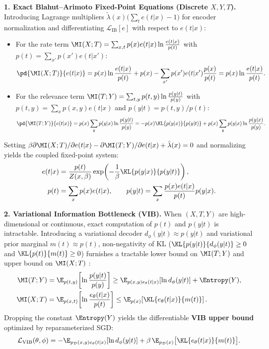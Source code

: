 \documentclass[../../../../master.tex]{subfiles}
\begin{document}
\begin{coremath}
\label{cm:infotheory:ib_vib}
\textbf{1. Exact Blahut--Arimoto Fixed-Point Equations (Discrete $X, Y, T$).} Introducing Lagrange multipliers $\tilde{\lambda}(x)\bigl(\sum_t e(t|x) - 1\bigr)$ for encoder normalization and differentiating $\mathcal{L}_{\mathrm{IB}}[e]$ with respect to $e(t|x)$:
\begin{itemize}[leftmargin=1.4em]
  \item For the rate term $\MI(X; T) = \sum_{x,t} p(x)e(t|x)\ln\frac{e(t|x)}{p(t)}$ with $p(t) = \sum_{x'} p(x')e(t|x')$:
  \[
    \pd{\MI(X; T)}{e(t|x)} = p(x)\ln\frac{e(t|x)}{p(t)} + p(x) - \sum_{x'} p(x')e(t|x')\frac{p(x)}{p(t)} = p(x)\ln\frac{e(t|x)}{p(t)}.
  \]
  \item For the relevance term $\MI(T; Y) = \sum_{t,y} p(t,y)\ln\frac{p(y|t)}{p(y)}$ with $p(t,y) = \sum_x p(x,y)e(t|x)$ and $p(y|t) = p(t,y)/p(t)$:
  \[
    \pd{\MI(T; Y)}{e(t|x)} = p(x)\sum_{y} p(y|x)\ln\frac{p(y|t)}{p(y)} = -p(x)\KL{p(y|x)}{p(y|t)} + p(x)\sum_y p(y|x)\ln\frac{p(y|x)}{p(y)}.
  \]
\end{itemize}
Setting $\beta\partial\MI(X;T)/\partial e(t|x) - \partial\MI(T;Y)/\partial e(t|x) + \tilde{\lambda}(x) = 0$ and normalizing yields the coupled fixed-point system:
\begin{equation}
\label{eq:infotheory:ib_ba}
\begin{aligned}
  e(t|x) &= \frac{p(t)}{Z(x, \beta)}\exp\!\left(-\frac{1}{\beta}\KL{p(y|x)}{p(y|t)}\right), \\
  p(t) &= \sum_x p(x)e(t|x),\qquad
  p(y|t) = \sum_x \frac{p(x)e(t|x)}{p(t)}p(y|x).
\end{aligned}
\end{equation}

\textbf{2. Variational Information Bottleneck (VIB).} When $(X, T, Y)$ are high-dimensional or continuous, exact computation of $p(t)$ and $p(y|t)$ is intractable. Introducing a variational decoder $d_\phi(y|t) \approx p(y|t)$ and variational prior marginal $m(t) \approx p(t)$, non-negativity of KL ($\KL{p(y|t)}{d_\phi(y|t)} \ge 0$ and $\KL{p(t)}{m(t)} \ge 0$) furnishes a tractable lower bound on $\MI(T;Y)$ and upper bound on $\MI(X;T)$ :
\begin{align}
  \MI(T; Y) &= \E_{p(t,y)}\!\left[\ln\frac{p(y|t)}{p(y)}\right] \ge \E_{p(x,y)e_\theta(t|x)}[\ln d_\phi(y|t)] + \Entropy(Y), \label{eq:infotheory:vib_lb}\\
  \MI(X; T) &= \E_{p(x,t)}\!\left[\ln\frac{e_\theta(t|x)}{p(t)}\right] \le \E_{p(x)}\!\left[\KL{e_\theta(t|x)}{m(t)}\right]. \label{eq:infotheory:vib_ub}
\end{align}
Dropping the constant $\Entropy(Y)$ yields the differentiable \textbf{VIB upper bound} optimized by reparameterized SGD:
\begin{equation}
\label{eq:infotheory:vib_loss}
  \mathcal{L}_{\mathrm{VIB}}(\theta, \phi) = -\E_{p_{\mathcal{D}}(x,y)e_\theta(t|x)}[\ln d_\phi(y|t)] + \beta\,\E_{p_{\mathcal{D}}(x)}\bigl[\KL{e_\theta(t|x)}{m(t)}\bigr].
\end{equation}


\end{coremath}
\end{document}
